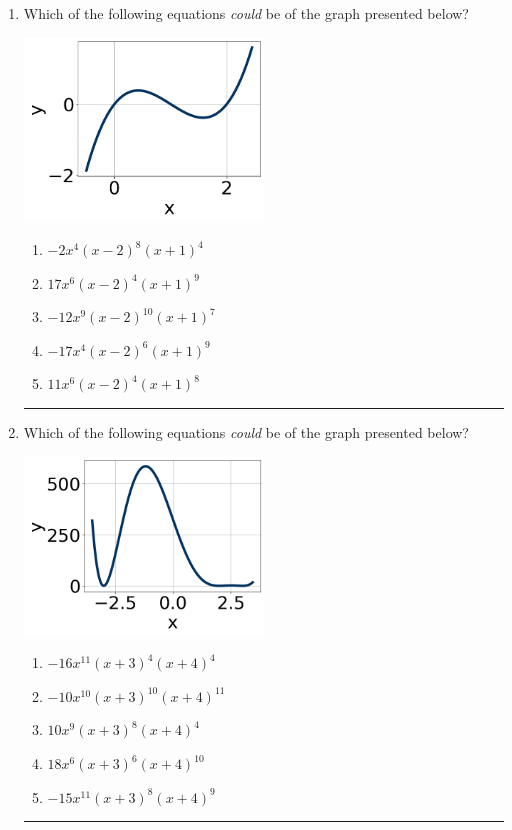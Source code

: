 \documentclass[14pt]{extbook}
\newcommand{\litem}[1]{\item#1\hspace*{-1cm}\rule{\textwidth}{0.4pt}}
\begin{document}
\begin{enumerate}
{\begin{enumerate}[label=\Alph*.]
\end{enumerate} }
\litem{
Which of the following equations \textit{could} be of the graph presented below?
\begin{center}
    \includegraphics[width=0.5\textwidth]{../Figures/polyGraphToFunctionCopyB.png}
\end{center}
\begin{enumerate}[label=\Alph*.]
\item \( -2x^{4} (x - 2)^{8} (x + 1)^{4} \)
\item \( 17x^{6} (x - 2)^{4} (x + 1)^{9} \)
\item \( -12x^{9} (x - 2)^{10} (x + 1)^{7} \)
\item \( -17x^{4} (x - 2)^{6} (x + 1)^{9} \)
\item \( 11x^{6} (x - 2)^{4} (x + 1)^{8} \)

\end{enumerate} }
\litem{
Which of the following equations \textit{could} be of the graph presented below?
\begin{center}
    \includegraphics[width=0.5\textwidth]{../Figures/polyGraphToFunctionB.png}
\end{center}
\begin{enumerate}[label=\Alph*.]
\item \( -16x^{11} (x + 3)^{4} (x + 4)^{4} \)
\item \( -10x^{10} (x + 3)^{10} (x + 4)^{11} \)
\item \( 10x^{9} (x + 3)^{8} (x + 4)^{4} \)
\item \( 18x^{6} (x + 3)^{6} (x + 4)^{10} \)
\item \( -15x^{11} (x + 3)^{8} (x + 4)^{9} \)


\end{enumerate}}
\end{enumerate}
\end{document}

